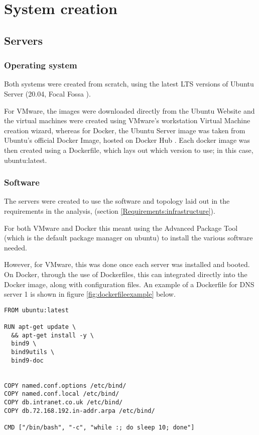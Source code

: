 
\chapter{System creation}
\section{Servers}
\subsection{Operating system}
Both systems were created from scratch, using the latest LTS versions of Ubuntu Server (20.04, Focal Fossa \citep{Ubuntu20.04Documentation}).

For VMware, the images were downloaded directly from the Ubuntu Website and the virtual machines were created using VMware's workstation Virtual Machine creation wizard, whereas for Docker, the Ubuntu Server image was taken from Ubuntu's official Docker Image, hosted on Docker Hub \citep{UbuntuDockerHub}. Each docker image was then created using a Dockerfile, which lays out which version to use; in this case, ubuntu:latest.

\subsection{Software}
The servers were created to use the software and topology laid out in the requirements in the analysis, (section \ref{Requirements:infrastructure}).

For both VMware and Docker this meant using the Advanced Package Tool (which is the default package manager on ubuntu) to install the various software needed.

However, for VMware, this was done once each server was installed and booted. On Docker, through the use of Dockerfiles, this can integrated directly into the Docker image, along with configuration files. An example of a Dockerfile for DNS server 1 is shown in figure \ref{fig:dockerfileexample} below.
\begin{verbatim}
FROM ubuntu:latest

RUN apt-get update \
  && apt-get install -y \
  bind9 \
  bind9utils \
  bind9-doc


COPY named.conf.options /etc/bind/
COPY named.conf.local /etc/bind/
COPY db.intranet.co.uk /etc/bind/
COPY db.72.168.192.in-addr.arpa /etc/bind/

CMD ["/bin/bash", "-c", "while :; do sleep 10; done"]

\end{verbatim}

